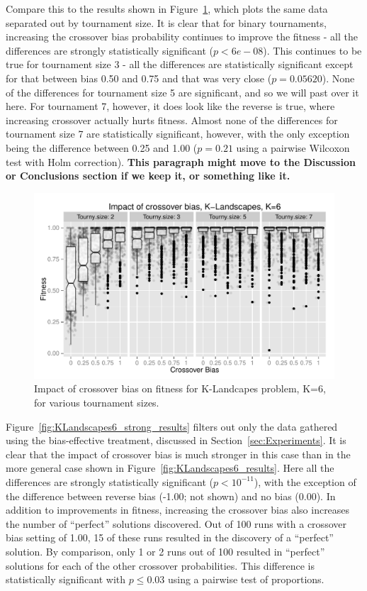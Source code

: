 \documentclass{sig-alternate}
\begin{document}
Compare this to the results shown in Figure~\ref{fig:KLandscapes6_XO_bias_impact_facets}, which plots the same data
separated out by tournament size. It is clear that for binary tournaments, increasing the crossover bias probability
continues to improve the fitness - all the differences are strongly statistically significant ($p<6e-08$). This
continues to be true for tournament size 3 - all the differences are statistically significant except for that between
bias 0.50 and 0.75 and that was very close ($p=0.05620$). None of the differences for tournament size 5 are
significant, and so we will past over it here. For tournament 7, however, it does look like the reverse is true, where
increasing crossover actually hurts fitness. Almost none of the differences for tournament size 7 are statistically
significant, however, with the only exception being the difference between 0.25 and 1.00 ($p=0.21$ using a pairwise
Wilcoxon test with Holm correction). \textbf{This paragraph might move to the Discussion or Conclusions section if we
keep it, or something like it.}

\begin{figure}
\centering
\includegraphics[width=0.45 \textwidth]{Plots/KLandscapes6_XO_bias_impact_facets.pdf}
\caption{Impact of crossover bias on fitness for K-Landcapes problem, K=6, for various tournament sizes.}
\label{fig:KLandscapes6_XO_bias_impact_facets}
\end{figure}

Figure~\ref{fig:KLandscapes6_strong_results} filters out only the data gathered using the bias-effective treatment,
discussed in Section~\ref{sec:Experiments}. It is clear that the impact of crossover bias is much stronger in this case
than in the more general case shown in Figure~\ref{fig:KLandscapes6_results}. Here all the differences are strongly
statistically significant ($p < 10^{-11}$), with the exception of the difference between reverse bias (-1.00; not shown)
and no bias (0.00). In addition to improvements in fitness, increasing the crossover bias also increases the number of
``perfect'' solutions discovered. Out of 100 runs with a crossover bias setting of 1.00, 15 of these runs resulted in
the discovery of a ``perfect'' solution. By comparison, only 1 or 2 runs out of 100 resulted in ``perfect'' solutions
for each of the other crossover probabilities. This difference is statistically significant with $p \leq 0.03$ using a
pairwise test of proportions.
\end{document}
